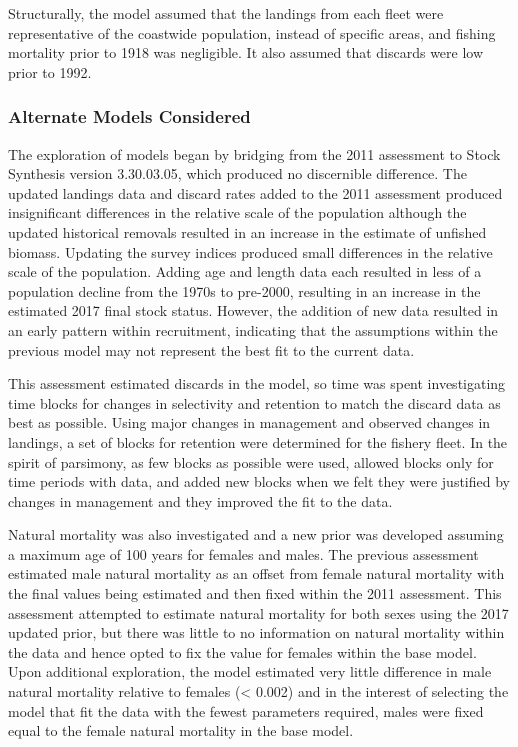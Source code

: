 \documentclass[12pt,]{article}
\begin{document}
Structurally, the model assumed that the landings from each fleet were
representative of the coastwide population, instead of specific areas,
and fishing mortality prior to 1918 was negligible. It also assumed that
discards were low prior to 1992.

\subsubsection{Alternate Models
Considered}\label{alternate-models-considered}

The exploration of models began by bridging from the 2011 assessment to
Stock Synthesis version 3.30.03.05, which produced no discernible
difference. The updated landings data and discard rates added to the
2011 assessment produced insignificant differences in the relative scale
of the population although the updated historical removals resulted in
an increase in the estimate of unfished biomass. Updating the survey
indices produced small differences in the relative scale of the
population. Adding age and length data each resulted in less of a
population decline from the 1970s to pre-2000, resulting in an increase
in the estimated 2017 final stock status. However, the addition of new
data resulted in an early pattern within recruitment, indicating that
the assumptions within the previous model may not represent the best fit
to the current data.

This assessment estimated discards in the model, so time was spent
investigating time blocks for changes in selectivity and retention to
match the discard data as best as possible. Using major changes in
management and observed changes in landings, a set of blocks for
retention were determined for the fishery fleet. In the spirit of
parsimony, as few blocks as possible were used, allowed blocks only for
time periods with data, and added new blocks when we felt they were
justified by changes in management and they improved the fit to the
data.

Natural mortality was also investigated and a new prior was developed
assuming a maximum age of 100 years for females and males. The previous
assessment estimated male natural mortality as an offset from female
natural mortality with the final values being estimated and then fixed
within the 2011 assessment. This assessment attempted to estimate
natural mortality for both sexes using the 2017 updated prior, but there
was little to no information on natural mortality within the data and
hence opted to fix the value for females within the base model. Upon
additional exploration, the model estimated very little difference in
male natural mortality relative to females (\textless{} 0.002) and in
the interest of selecting the model that fit the data with the fewest
parameters required, males were fixed equal to the female natural
mortality in the base model.
\end{document}
